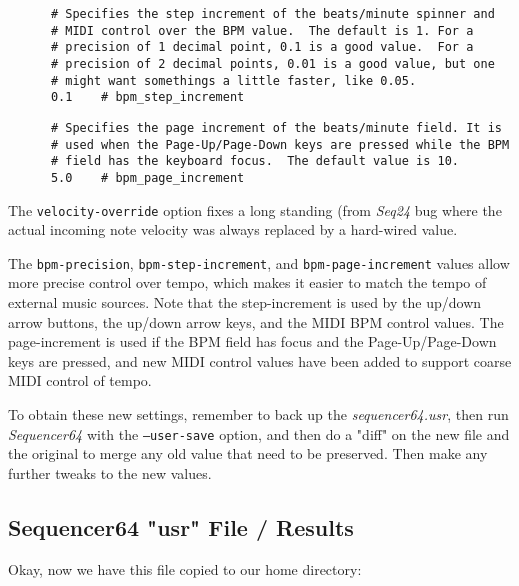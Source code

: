   \begin{verbatim}
      # Specifies the step increment of the beats/minute spinner and
      # MIDI control over the BPM value.  The default is 1. For a
      # precision of 1 decimal point, 0.1 is a good value.  For a
      # precision of 2 decimal points, 0.01 is a good value, but one
      # might want somethings a little faster, like 0.05.
      0.1    # bpm_step_increment
   \end{verbatim}

   \begin{verbatim}
      # Specifies the page increment of the beats/minute field. It is
      # used when the Page-Up/Page-Down keys are pressed while the BPM
      # field has the keyboard focus.  The default value is 10.
      5.0    # bpm_page_increment
   \end{verbatim}

      The \texttt{velocity-override} option fixes a long standing (from
      \textsl{Seq24} bug where the actual incoming note velocity was always
      replaced by a hard-wired value.

      The \texttt{bpm-precision}, \texttt{bpm-step-increment}, and
      \texttt{bpm-page-increment} values allow more precise control over tempo,
      which makes it easier to match the tempo of external music sources.  Note
      that the step-increment is used by the up/down arrow buttons, the up/down
      arrow keys, and the MIDI BPM control values.  The page-increment is used
      if the BPM field has focus and the Page-Up/Page-Down keys are pressed,
      and new MIDI control values have been added to support coarse MIDI
      control of tempo.

   To obtain these new settings, remember to back up the
   \textsl{sequencer64.usr}, then run \textsl{Sequencer64} with the
   \texttt{--user-save} option, and then do a "diff" on the new file and the
   original to merge any old value that need to be preserved.  Then make any
   further tweaks to the new values.

\subsection{Sequencer64 "usr" File / Results}
\label{subsec:seq64_usr_file_midi_bus_results}

   Okay, now we have this file copied to our home directory:

